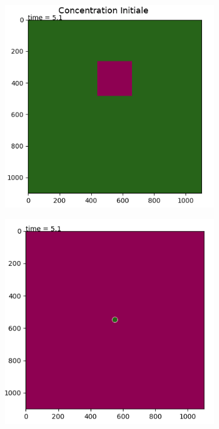 \documentclass[11pt]{article}
\begin{document}
\begin{figure}[hbt!]
\centering
\begin{subfigure}[b]{\textwidth}
\includegraphics[width=.35\textwidth]{Images/CInitial.png}
\end{subfigure}
\begin{subfigure}[b]{0.45\textwidth}
\includegraphics[width=\textwidth]{Images/Rho2d0.png}
\end{subfigure}
\begin{subfigure}[b]{0.45\textwidth}

\end{subfigure}
\end{figure}
\end{document}
